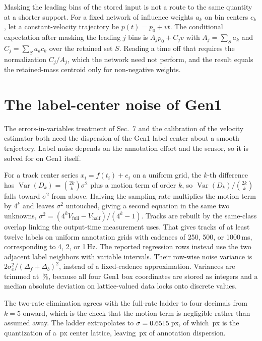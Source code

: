 \documentclass[10pt,twocolumn,letterpaper]{article}
\begin{document}
Masking the leading bins of the stored input is not a route to the same quantity
at a shorter support. For a fixed network of influence weights $a_{k}$ on bin
centers $c_{k}$, let a constant-velocity trajectory be
$p(t)=p_{0}+vt$. The conditional expectation after masking the leading $j$ bins
is $A_{j}p_{0}+C_{j}v$ with $A_{j}=\sum_{S}a_{k}$ and $C_{j}=\sum_{S}a_{k}c_{k}$
over the retained set $S$. Reading a time off that requires the normalization
$C_{j}/A_{j}$, which the network need not perform, and the result equals the
retained-mass centroid only for non-negative weights.

\section{The label-center noise of Gen1}
\label{sup:labelnoise}

The errors-in-variables treatment of Sec.~7 and the calibration of the velocity
estimator both need the dispersion of the Gen1 label center about a smooth
trajectory. Label noise depends on the annotation effort and the sensor, so it is solved for on Gen1 itself.

For a track center series $x_i=f(t_i)+e_i$ on a uniform grid, the $k$-th
difference has $\operatorname{Var}(D_k)=\binom{2k}{k}\sigma^{2}$ plus a motion
term of order $k$, so $\operatorname{Var}(D_k)/\binom{2k}{k}$ falls toward
$\sigma^{2}$ from above. Halving the sampling rate multiplies the motion term by
$4^{k}$ and leaves $\sigma^{2}$ untouched, giving a second equation in the same
two unknowns, $\sigma^{2}=(4^{k}V_{\text{full}}-V_{\text{half}})/(4^{k}-1)$.
Tracks are rebuilt by the same-class overlap linking the output-time
measurement uses. That gives  tracks of at least twelve labels on
uniform annotation grids with cadences of 250, 500, or 1000\,ms, corresponding
to 4, 2, or 1\,Hz. The reported regression rows instead use the two adjacent
label neighbors with variable intervals. Their row-wise noise variance is
$2\sigma_c^2/(\Delta_f+\Delta_b)^2$, instead of a fixed-cadence approximation.
Variances are trimmed at \ladderTrimPct\,\%, because all four Gen1 box
coordinates are stored as integers and a median absolute deviation on
lattice-valued data locks onto discrete values.

The two-rate elimination agrees with the full-rate ladder to four decimals from
$k=5$ onward, which is the check that the motion term is negligible rather than
assumed away. The ladder extrapolates to $\sigma=0.6515$\,px, of which
\,px is the quantization of a \sigmaClattice\,px center lattice, leaving
\,px of annotation dispersion.
\end{document}
